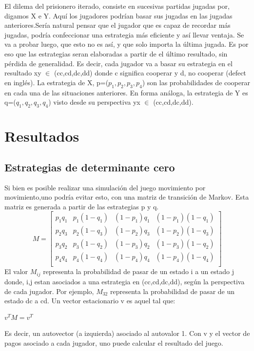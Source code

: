 \documentclass[12pt]{article}
\begin{document}
El dilema del prisionero iterado, consiste en sucesivas partidas jugadas por, digamos X e Y.
Aquí los jugadores podrían basar sus jugadas en las jugadas anteriores.Sería natural pensar que el jugador que es
capaz de recordar más jugadas, podría confeccionar una estrategia más eficiente y así llevar ventaja.
Se va a probar luego, que esto no es así, y que solo importa la última jugada. Es por eso que las estrategias seran elaboradas
a partir de el último resultado, sin pérdida de generalidad.
Es decir, cada jugador va a basar su estrategia en el resultado xy $\in$ (cc,cd,dc,dd) donde c significa cooperar y d, no cooperar 
(defect en inglés). La estrategia de X, p=($p_1,p_2,p_3,p_4$) son las probabilidades de cooperar en cada una de las situaciones 
anteriores. En forma análoga, la estrategia de Y es q=($q_1,q_2,q_3,q_4$) visto desde su perspectiva yx $\in$ (cc,cd,dc,dd).

\section{Resultados}
\subsection{Estrategias de determinante cero}
Si bien es posible realizar una simulación del juego movimiento por movimiento,uno podría evitar esto, con una matriz
de transición de Markov. Esta matriz es generada a partir de las estrategias p y q.
$$M=
\begin{bmatrix}
 p_1 q_1 &p_1(1-q_1) &(1-p_1)q_1 &(1-p_1)(1-q_1)\\
 p_2 q_3 &p_2(1-q_3) &(1-p_2)q_3 &(1-p_2)(1-q_3)\\
 p_3 q_2 &p_3(1-q_2) &(1-p_3)q_2 &(1-p_3)(1-q_2)\\
 p_4 q_4 &p_4(1-q_4) &(1-p_4)q_4 &(1-p_4)(1-q_4)\\
\end{bmatrix}
$$
El valor $M_{ij}$ representa la probabilidad de pasar de un estado i a un estado j donde, i,j estan asociados a una 
estrategia en (cc,cd,dc,dd), según la perspectiva de cada jugador.
Por ejemplo, $M_{32}$ representa la probabilidad de pasar de un estado dc a cd.
Un vector estacionario v es aquel tal que:
\begin{center}
$v^T M = v^T$
\end{center}
Es decir, un autovector (a izquierda) asociado al autovalor 1.
Con v y el vector de pagos asociado a cada jugador, uno puede calcular el resultado del juego.
\end{document}
